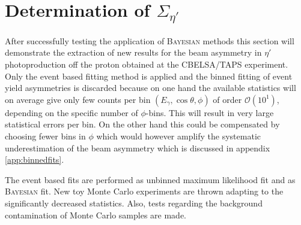 \section{Determination of $\Sigma_{\eta'}$}
\label{sec:sigma_etap}
After successfully testing the application of \textsc{Bayesian} methods this section will demonstrate the extraction of new results for the beam asymmetry in $\eta'$ photoproduction off the proton obtained at the CBELSA/TAPS experiment. Only the event based fitting method is applied and the binned fitting of event yield asymmetries is discarded because on one hand the available statistics will on average give only few counts per bin $\left(E_\gamma,\cos\theta,\phi\right)$ of order $\mathcal{O}\left(10^1\right)$, depending on the specific number of $\phi$-bins. This will result in very large statistical errors per bin. On the other hand this could be compensated by choosing fewer bins in $\phi$ which would however amplify the systematic underestimation of the beam asymmetry which is discussed in appendix \ref{app:binnedfits}.

The event based fits are performed as unbinned maximum likelihood fit and as \textsc{Bayesian} fit. New toy Monte Carlo experiments are thrown adapting to the significantly decreased statistics. Also, tests regarding the background contamination of Monte Carlo samples are made.   
